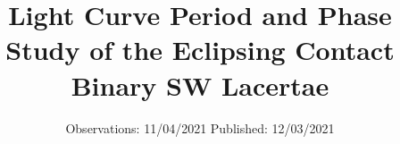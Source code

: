 

\subject{Final Paper for Observational Astronomy AST401L}
\title{Light Curve Period and Phase Study of the Eclipsing Contact Binary SW Lacertae}
\date{%
  Observations: 11/04/2021
  \hspace{3em}
  Published: 12/03/2021
}



\maketitle
\thispagestyle{empty}
\tableofcontents
\newpage








\printbibliography{}


